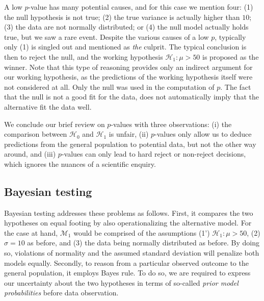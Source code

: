 \documentclass[english,,doc,floatsintext]{apa6}
\begin{document}
A low \(p\)-value has many potential causes, and for this case we mention four: (1) the null hypothesis is not true; (2) the true variance is actually higher than \(10\); (3) the data are not normally distributed; or (4) the null model actually holds true, but we saw a rare event. Despite the various causes of a low \(p\), typically only (1) is singled out and mentioned as \emph{the} culprit. The typical conclusion is then to reject the null, and the working hypothesis \(\mathcal{H}_{1} : \mu > 50\) is proposed as the winner. Note that this type of reasoning provides only an indirect argument for our working hypothesis, as the predictions of the working hypothesis itself were not considered at all. Only the null was used in the computation of \(p\). The fact that the null is not a good fit for the data, does not automatically imply that the alternative fit the data well.

We conclude our brief review on \(p\)-values with three observations: (i) the comparison between \(\mathcal{H}_{0}\) and \(\mathcal{H}_{1}\) is unfair, (ii) \(p\)-values only allow us to deduce predictions from the general population to potential data, but not the other way around, and (iii) \(p\)-values can only lead to hard reject or non-reject decisions, which ignores the nuances of a scientific enquiry.

\subsection{Bayesian testing}

Bayesian testing addresses these problems as follows. First, it compares the two hypotheses on equal footing by also operationalizing the alternative model. For the case at hand, \(\mathcal{M}_{1}\) would be comprised of the assumptions (1') \(\mathcal{H}_{1}: \mu > 50\), (2) \(\sigma =10\) as before, and (3) the data being normally distributed as before. By doing so, violations of normality and the assumed standard deviation will penalize both models equally. Secondly, to reason from a particular observed outcome to the general population, it employs Bayes rule. To do so, we are required to express our uncertainty about the two hypotheses in terms of so-called \emph{prior model probabilities} before data observation.
\end{document}

